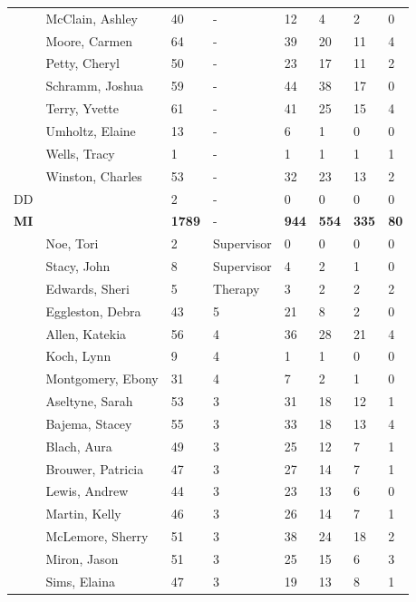 \documentclass{article}\usepackage[]{graphicx}\usepackage[]{color}
\begin{document}
{\begin{longtable} { >{\raggedright}p{}p{}p{}p{}p{}p{}p{}p{}}
   & McClain, Ashley & 40 & - & 12 & 4 & 2 & 0 \\ 
   \rowcolor[gray]{0.90} & Moore, Carmen & 64 & - & 39 & 20 & 11 & 4 \\ 
   \rowcolor[gray]{0.90} & Petty, Cheryl & 50 & - & 23 & 17 & 11 & 2 \\ 
   \rowcolor[gray]{0.90} & Schramm, Joshua & 59 & - & 44 & 38 & 17 & 0 \\ 
   & Terry, Yvette & 61 & - & 41 & 25 & 15 & 4 \\ 
   & Umholtz, Elaine & 13 & - & 6 & 1 & 0 & 0 \\ 
   & Wells, Tracy & 1 & - & 1 & 1 & 1 & 1 \\ 
   \rowcolor[gray]{0.90} & Winston, Charles & 53 & - & 32 & 23 & 13 & 2 \\ 
   \hline
DD &  & 2 & - & 0 & 0 & 0 & 0 \\ 
   \hline
\textbf{MI} &  & \textbf{1789} & - & \textbf{944} & \textbf{554} & \textbf{335} & \textbf{80} \\ 
   & Noe, Tori & 2 & Supervisor & 0 & 0 & 0 & 0 \\ 
   & Stacy, John & 8 & Supervisor & 4 & 2 & 1 & 0 \\ 
   & Edwards, Sheri & 5 & Therapy & 3 & 2 & 2 & 2 \\ 
   \rowcolor[gray]{0.90} & Eggleston, Debra & 43 & 5 & 21 & 8 & 2 & 0 \\ 
   \rowcolor[gray]{0.90} & Allen, Katekia & 56 & 4 & 36 & 28 & 21 & 4 \\ 
   \rowcolor[gray]{0.90} & Koch, Lynn & 9 & 4 & 1 & 1 & 0 & 0 \\ 
   & Montgomery, Ebony & 31 & 4 & 7 & 2 & 1 & 0 \\ 
   & Aseltyne, Sarah & 53 & 3 & 31 & 18 & 12 & 1 \\ 
   & Bajema, Stacey & 55 & 3 & 33 & 18 & 13 & 4 \\ 
   \rowcolor[gray]{0.90} & Blach, Aura & 49 & 3 & 25 & 12 & 7 & 1 \\ 
   \rowcolor[gray]{0.90} & Brouwer, Patricia & 47 & 3 & 27 & 14 & 7 & 1 \\ 
   \rowcolor[gray]{0.90} & Lewis, Andrew & 44 & 3 & 23 & 13 & 6 & 0 \\ 
   & Martin, Kelly & 46 & 3 & 26 & 14 & 7 & 1 \\ 
   & McLemore, Sherry & 51 & 3 & 38 & 24 & 18 & 2 \\ 
   & Miron, Jason & 51 & 3 & 25 & 15 & 6 & 3 \\ 
   \rowcolor[gray]{0.90} & Sims, Elaina & 47 & 3 & 19 & 13 & 8 & 1 \\ 

\end{longtable}}
\end{document}
